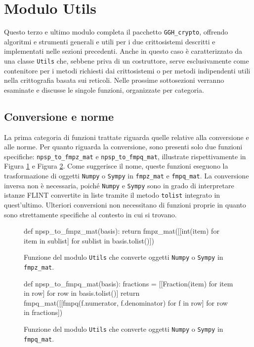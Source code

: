 \section{Modulo Utils}
\label{sec:moduloutils}

Questo terzo e ultimo modulo completa il pacchetto \texttt{GGH\_crypto}, offrendo algoritmi 
e strumenti generali e utili per i due crittosistemi descritti e implementati nelle sezioni 
precedenti. 
Anche in questo caso è caratterizzato da una classe \texttt{Utils} che,
sebbene priva di un costruttore, serve esclusivamente come contenitore per i metodi 
richiesti dai crittosistemi o per metodi indipendenti utili nella crittografia basata 
sui reticoli. Nelle prossime sottosezioni verranno esaminate e discusse le singole
funzioni, organizzate per categoria. 

\subsection{Conversione e norme}

La prima categoria di funzioni trattate riguarda quelle relative alla conversione e 
alle norme. Per quanto riguarda la conversione, sono presenti solo due funzioni specifiche:  
\texttt{npsp\_to\_fmpz\_mat} e \texttt{npsp\_to\_fmpq\_mat}, illustrate rispettivamente in 
Figura \ref{fig:npsp_to_fmpz_mat} e Figura \ref{fig:npsp_to_fmpq_mat}.
Come suggerisce il nome, queste funzioni eseguono la trasformazione di 
oggetti \texttt{Numpy} o \texttt{Sympy} in \texttt{fmpz\_mat} e \texttt{fmpq\_mat}. 
La conversione inversa non è necessaria, poiché \texttt{Numpy} e \texttt{Sympy} sono
in grado di interpretare 
istanze FLINT convertite in liste tramite il metodo \texttt{tolist} integrato in quest'ultimo.
Ulteriori conversioni non necessitano di funzioni proprie in quanto sono strettamente 
specifiche al contesto in cui si trovano. 
\begin{figure}[h]
    \begin{python}
        def npsp_to_fmpz_mat(basis):
            return fmpz_mat([[int(item) for item in sublist] 
                    for sublist in basis.tolist()])
    \end{python}
    \caption[Conversione da \texttt{Numpy} o \texttt{Sympy} in \texttt{fmpz\_mat}.]
    {Funzione del modulo \texttt{Utils} che converte oggetti \texttt{Numpy} o \texttt{Sympy}  
    in \texttt{fmpz\_mat}.}
    \label{fig:npsp_to_fmpz_mat}
\end{figure}

\begin{figure}[h]
    \begin{python}
        def npsp_to_fmpq_mat(basis):
            fractions = [[Fraction(item) for item in row] 
                                    for row in basis.tolist()]
            return fmpq_mat([[fmpq(f.numerator, f.denominator) 
                                for f in row] for row in fractions])
    \end{python}
    \caption[Conversione da \texttt{Numpy} o \texttt{Sympy} in \texttt{fmpq\_mat}.]
    {Funzione del modulo \texttt{Utils} che converte oggetti \texttt{Numpy} o \texttt{Sympy}  
    in \texttt{fmpq\_mat}.}
    \label{fig:npsp_to_fmpq_mat}
\end{figure}

